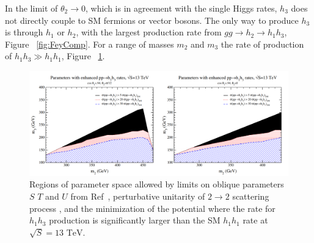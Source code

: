 \indent In the limit of ${\theta_{2}\rightarrow{0}}$, which is in agreement with the single Higgs rates, ${h_{3}}$ does not directly couple to SM fermions or vector bosons. The only way to produce ${h_{3}}$ is through ${h_{1}}$ or ${h_{2}}$, with the largest production rate from ${gg\rightarrow h_{2}\rightarrow h_{1}h_{3}}$, Figure ~\ref{fig:FeyComp}. For a range of masses ${m_{2}}$ and ${m_{3}}$ the rate of production of ${h_{1}h_{3} \gg h_{1}h_{1}}$, Figure ~\ref{fig:CSH6}. \newline

\begin{figure}[h]
\begin{center}
\includegraphics[scale=0.4]{figures/CompHiggsSing_Fig6_2}
\caption[Allowed regions of parameter space with enhanced di-Higgs production]{Regions of parameter space allowed by limits on oblique parameters $S$ $T$ and $U$ from Ref~\cite{deBlas2016}, perturbative unitarity of $2\rightarrow2$ scattering process \cite{PhysRevD.16.1519}, and the minimization of the potential where the rate for ${h_{1}h_{3}}$ production is significantly larger than the SM ${h_{1}h_{1}}$ rate at ${\sqrt{S} = 13 \text{ TeV}}$.}
\label{fig:CSH6}
\end{center}
\end{figure}


